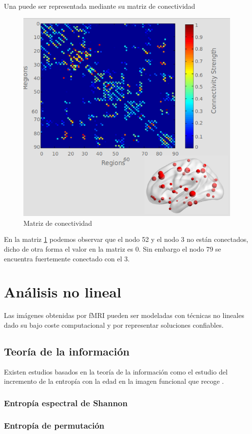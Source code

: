 Una puede ser representada mediante su matriz de conectividad

	\begin{figure}[H]
  		\centering
    	\includegraphics[scale=0.5]{img/matrix_conect.png}
  		\caption{Matriz de conectividad}         \label{preproc:matrix_conect}
	\end{figure}
	
En la matriz \ref{preproc:matrix_conect} podemos observar que el nodo 52 y el nodo 3 no están conectados, dicho de otra forma el valor en la matriz es 0. Sin embargo el nodo 79 se encuentra fuertemente conectado con el 3.

\section{Análisis no lineal}

Las imágenes obtenidas por fMRI pueden ser modeladas con técnicas no lineales dado su bajo coste computacional y por representar soluciones confiables. 

\subsection{Teoría de la información}
Existen estudios basados en la teoría de la información como el estudio del incremento de la entropía con la edad en la imagen funcional que recoge \cite{Yao2013}.

\subsubsection{Entropía espectral de Shannon}
\subsubsection{Entropía de permutación}